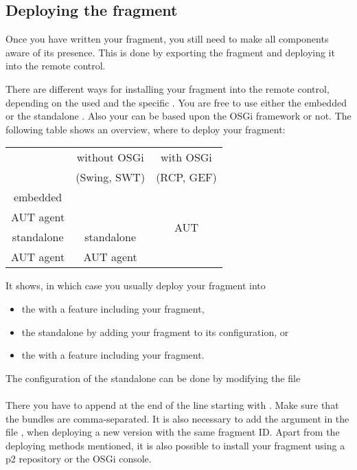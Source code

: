\subsection{Deploying the fragment}

Once you have written your fragment, you still need to make all components
aware of its presence. This is done by exporting the fragment and
deploying it into the remote control.

There are different ways for installing your fragment into the remote
control, depending on the  \gdagent{} used and the specific \gdaut{}. You are free to
use either the embedded \gdagent{} or the standalone \gdagent{}. Also your \gdaut{}
can be based upon the OSGi framework or not. The following table shows an
overview, where to deploy your fragment:

\begin{center}
\begin{tabular}{|c||c|c|}
\hline
~ & without OSGi & with OSGi\\
~ & (Swing, SWT) & (RCP, GEF)\\
\hline\hline
embedded & \multirow{2}{*}{\ite{}} & \multirow{4}{*}{AUT}\\
AUT agent & & \\
\hhline{--~}
standalone & standalone & \\
AUT agent  & AUT agent  & \\
\hline
\end{tabular}
\end{center}

It shows, in which case you usually deploy your fragment into
\begin{itemize}
  \item the \ite{} with a feature including your fragment,
  \item the standalone \gdagent{} by adding your fragment to its configuration,
        or
  \item the \gdaut{} with a feature including your fragment.
\end{itemize}

The configuration of the standalone \gdagent{} can be done by modifying the
file\\
\\
There you have to append  at the end of the line starting
with . Make sure that the bundles are comma-separated.
It is also necessary to add the argument  in the file
, when deploying a new version with the same
fragment ID. Apart from the deploying methods mentioned, it is also possible to
install your fragment using a p2 repository or the OSGi console.


